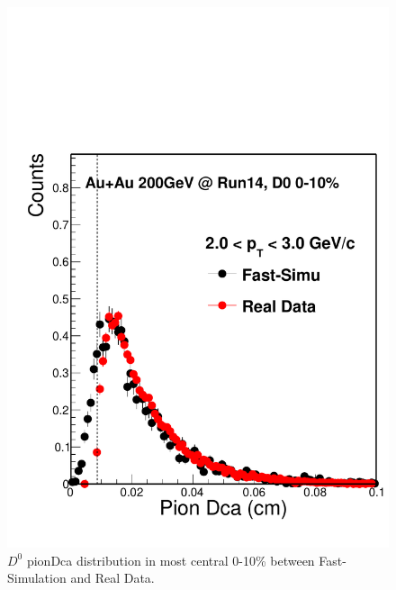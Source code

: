 \documentclass[a4paper]{article}
\begin{document}
\begin{figure}[htbp]
\begin{minipage}[htbp]{0.52\linewidth}
\centering
\includegraphics[width=1.0\textwidth,angle=0]{fig/pionDca.pdf}
\caption{ $D^0$ pionDca distribution in most central 0-10\% between Fast-Simulation and Real Data. \label{pionDca}}
\end{minipage}
\hfill
\begin{minipage}[htbp]{0.52\linewidth}
\centering

\end{minipage}
\end{figure}
\end{document}

